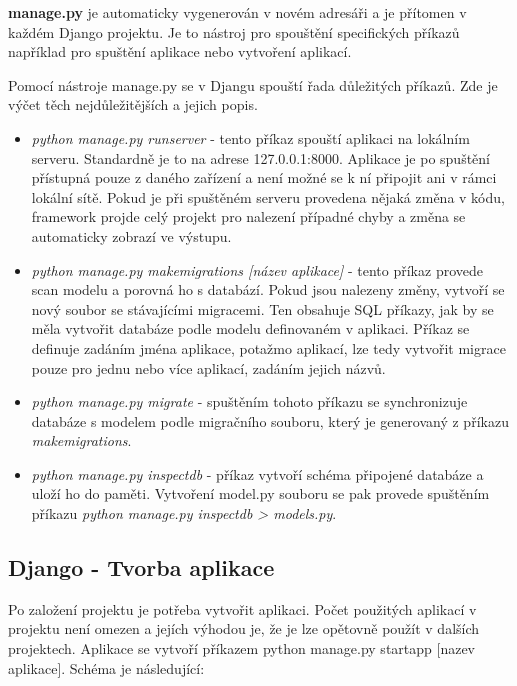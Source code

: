 \textbf{manage.py} je automaticky vygenerován v novém adresáři a je
přítomen v každém Django projektu. Je to nástroj pro spouštění
specifických příkazů například pro spuštění aplikace nebo vytvoření
aplikací.

\newpage

Pomocí nástroje manage.py se v Djangu spouští řada důležitých
příkazů. Zde je výčet těch nejdůležitějších a jejich popis.

\begin{itemize}
\item \textit{python manage.py runserver} - tento příkaz spouští
  aplikaci na lokálním serveru. Standardně je to na adrese
  127.0.0.1:8000. Aplikace je po spuštění přístupná pouze z daného
  zařízení a není možné se k ní připojit ani v rámci lokální
  sítě. Pokud je při spuštěném serveru provedena nějaká změna v kódu,
  framework projde celý projekt pro nalezení případné chyby a změna se
  automaticky zobrazí ve výstupu.
	
\item \textit{python manage.py makemigrations [název aplikace]} -
  tento příkaz provede scan modelu a porovná ho s databází. Pokud jsou
  nalezeny změny, vytvoří se nový soubor se stávajícími migracemi. Ten
  obsahuje SQL příkazy, jak by se měla vytvořit databáze podle modelu
  definovaném v aplikaci. Příkaz se definuje zadáním jména aplikace,
  potažmo aplikací, lze tedy vytvořit migrace pouze pro jednu nebo
  více aplikací, zadáním jejich názvů.

\item \textit{python manage.py migrate} - spuštěním tohoto příkazu se
  synchronizuje databáze s modelem podle migračního souboru, který je
  generovaný z příkazu \newline \textit{makemigrations}.
	
\item \textit{python manage.py inspectdb} - příkaz vytvoří schéma
  připojené databáze a uloží ho do paměti. Vytvoření model.py souboru
  se pak provede spuštěním příkazu \textit{python manage.py inspectdb
    > models.py}.

\end{itemize}

\newpage

\subsection{Django - Tvorba aplikace}

Po založení projektu je potřeba vytvořit aplikaci. Počet použitých
aplikací v projektu není omezen a jejích výhodou je, že je lze
opětovně použít v dalších projektech. Aplikace se vytvoří příkazem
python manage.py startapp [nazev aplikace]. Schéma je následující:

